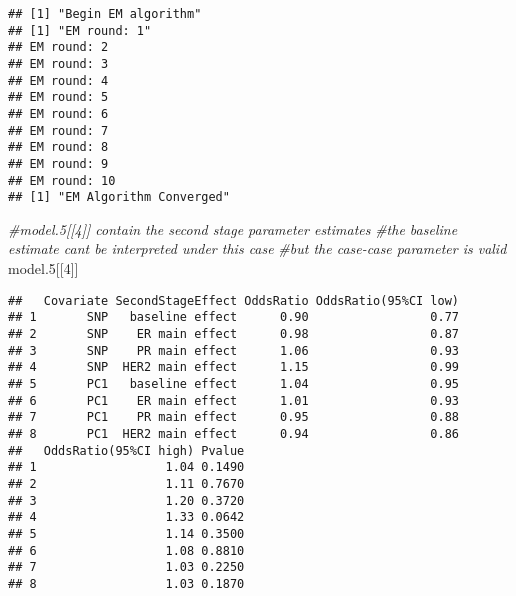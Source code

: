 \documentclass[11pt,]{article}
\newenvironment{Shaded}{\begin{snugshade}}{\end{snugshade}}
\newcommand{\CommentTok}[1]{\textcolor[rgb]{0.56,0.35,0.01}{\textit{#1}}}
\newcommand{\DecValTok}[1]{\textcolor[rgb]{0.00,0.00,0.81}{#1}}
\newcommand{\FloatTok}[1]{\textcolor[rgb]{0.00,0.00,0.81}{#1}}
\newcommand{\NormalTok}[1]{#1}
\begin{document}
\begin{verbatim}
## [1] "Begin EM algorithm"
## [1] "EM round: 1"
## EM round: 2
## EM round: 3
## EM round: 4
## EM round: 5
## EM round: 6
## EM round: 7
## EM round: 8
## EM round: 9
## EM round: 10
## [1] "EM Algorithm Converged"
\end{verbatim}

\begin{Shaded}
\begin{Highlighting}[]
\CommentTok{\#model.5[[4]] contain the second stage parameter estimates}
\CommentTok{\#the baseline estimate can\textquotesingle{}t be interpreted under this case}
\CommentTok{\#but the case{-}case parameter is valid}
\NormalTok{model}\FloatTok{.5}\NormalTok{[[}\DecValTok{4}\NormalTok{]]}
\end{Highlighting}
\end{Shaded}

\begin{verbatim}
##   Covariate SecondStageEffect OddsRatio OddsRatio(95%CI low)
## 1       SNP   baseline effect      0.90                 0.77
## 2       SNP    ER main effect      0.98                 0.87
## 3       SNP    PR main effect      1.06                 0.93
## 4       SNP  HER2 main effect      1.15                 0.99
## 5       PC1   baseline effect      1.04                 0.95
## 6       PC1    ER main effect      1.01                 0.93
## 7       PC1    PR main effect      0.95                 0.88
## 8       PC1  HER2 main effect      0.94                 0.86
##   OddsRatio(95%CI high) Pvalue
## 1                  1.04 0.1490
## 2                  1.11 0.7670
## 3                  1.20 0.3720
## 4                  1.33 0.0642
## 5                  1.14 0.3500
## 6                  1.08 0.8810
## 7                  1.03 0.2250
## 8                  1.03 0.1870
\end{verbatim}
\end{document}
